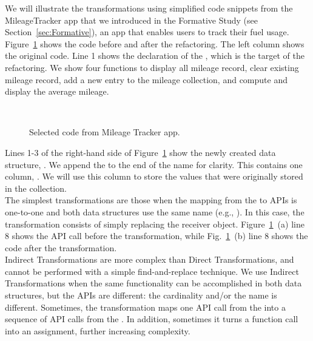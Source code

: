 \documentclass{sigplanconf}
\begin{document}
We will illustrate the transformations using simplified code snippets from the MileageTracker app that we introduced in the Formative Study (see Section~\ref{sec:Formative}), an app that enables users to track their fuel usage. Figure~\ref{fig:codeTransformations} shows the code before and after the refactoring. The left column shows the original code. 
Line 1 shows the declaration of the  \NC{}, which is the target of the refactoring. We show four functions to display all mileage record, clear existing mileage record, add a new entry to the mileage collection, and compute and display the average mileage. \\

\begin{figure}
   \centering
    \mbox{
      \subfigure[before]{
      
      \label{fig:aicOverload}
      }
      \hspace{0.2in}
      \subfigure[after]{
      
      \label{fig:lambdaOverload}
      }
    }
    \caption{Selected code from Mileage Tracker app.}
    \label{fig:codeTransformations}
\end{figure}

Lines 1-3 of the right-hand side of Figure~\ref{fig:codeTransformations} show the newly created data structure, . We append the  to the end of the name for clarity. This  contains one column, . We will use this column to store the values that were originally stored in the  collection.
\\


 The simplest transformations are those when the mapping from the \NC{} to \CDT APIs is one-to-one and both data structures use the same name (e.g., ). In this case, the transformation consists of simply replacing the receiver object. 
Figure~\ref{fig:codeTransformations}~(a) line 8 shows the API call before the transformation, while Fig.~\ref{fig:codeTransformations}~(b) line 
8 shows the code after the transformation.\\

Indirect Transformations are more complex than Direct Transformations, and cannot be performed with a simple find-and-replace technique. We use Indirect Transformations when the same functionality can be accomplished in both data structures, but the APIs are different: the cardinality and/or the name is different. Sometimes, the transformation maps one API call from the \NC{} into a sequence of API calls from the \CDT{}. In addition, sometimes it turns a function call into an assignment, further increasing complexity.
\end{document}
